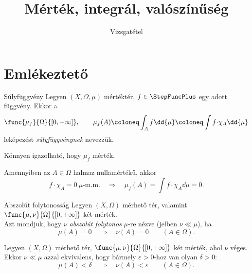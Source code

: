 \documentclass[
]{elteikthesis}[2024/04/26]
\title{Mérték, integrál, valószínűség} %
\subtitle{\circled{22} Vizsgatétel}
\begin{document}
	
	
	\section{Emlékeztető}
	
	\begin{definition}{Súlyfüggvény}{}
		Legyen \( (X, \Omega, \mu) \) mértéktér, 
		\( f \in \StepFuncPlus \) egy adott függvény. Ekkor a
		\[
		\func{\mu_f}{\Omega}{[0, +\infty]}, \qquad 
		\mu_f(A) \coloneq 
		\int_A f \dd{\mu} \coloneq 
		\int f {\cdot} \chi_A \dd{\mu}
		\]
		leképezést \emph{súlyfüggvénynek} nevezzük.
	\end{definition}
	
	\begin{notes}
		\item Könnyen igazolható, hogy \( \mu_f \) mérték.
		
		\item Amennyiben az \( A \in \Omega \) halmaz nullamértékű, akkor
		\[
			f {\cdot} \chi_A = 0 \ \mu \text{-m.m.}
			\quad \Longrightarrow \quad
			\mu_f(A) = 
			\int f {\cdot} \chi_A \dd{\mu} =
			0.
		\]
	\end{notes}
	
	\begin{definition}{Abszolút folytonosság}{}
		Legyen \( (X, \Omega) \) mérhető tér, 
		valamint \( \func{\mu, \nu}{\Omega}{[0, +\infty]} \) két mérték.\\[6pt]
		Azt mondjuk, 
		hogy \( \nu \) \emph{abszolút folytonos} \( \mu \)-re nézve (jelben \( \nu \ll \mu \)), ha
		\[
			\mu(A) = 0
			\quad \Longrightarrow \quad
			\nu(A) = 0
			\qquad (A \in \Omega).
		\]
	\end{definition}
	
	\begin{lemma}{}{}
		Legyen \( (X, \Omega) \) mérhető tér, 
		\( \func{\mu, \nu}{\Omega}{[0, +\infty]} \) két mérték, ahol \( \nu \) véges.\\[6pt]
		Ekkor \( \nu \ll \mu \) azzal ekvivalens, hogy
		bármely \( \varepsilon > 0 \)-hoz van olyan \( \delta > 0 \):
		\[
		\mu(A) < \delta
		\quad \Longrightarrow \quad
		\nu(A) < \varepsilon
		\qquad (A \in \Omega).
		\]
	\end{lemma}
	
\end{document}
